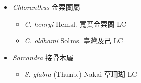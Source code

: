 
  \begin{itemize}
 \item[] \textit{Chloranthus} 金粟蘭屬
                                
  \begin{itemize}
        \item[] \textit{C. henryi} Hemsl.  寬葉金粟蘭   LC
        \item[] \textit{C. oldhami} Solms.  臺灣及己   LC
  \end{itemize}
 \item[] \textit{Sarcandra} 接骨木屬
                                
  \begin{itemize}
        \item[] \textit{S. glabra} (Thunb.) Nakai  草珊瑚   LC
  \end{itemize}
  \end{itemize}
